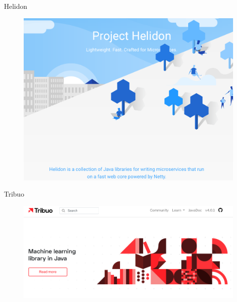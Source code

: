 \documentclass[aspectratio=169]{beamer}
\begin{document}
\begin{frame}{Helidon}

	\begin{figure}
		\centering
		\includegraphics[width=\linewidth]{Images/helidon}
	\end{figure}

\end{frame}

\begin{frame}{Tribuo}

	\begin{figure}
		\centering
		\includegraphics[width=\linewidth]{Images/tribuo}
	\end{figure}

\end{frame}
\end{document}
